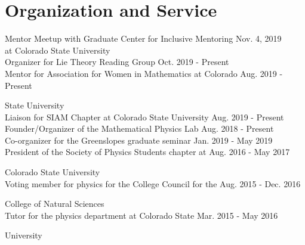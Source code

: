 \documentclass[12pt]{article} %
\begin{document}
\section{Organization and Service}
\begin{flushleft}
Mentor Meetup with Graduate Center for Inclusive Mentoring \hfill Nov. 4, 2019\\

\noindent  at Colorado State University\\
\vspace*{5pt}
Organizer for Lie Theory Reading Group \hfill Oct. 2019 - Present\\
\vspace*{5pt}
Mentor for Association for Women in Mathematics at Colorado \hfill Aug. 2019 - Present

\noindent  State University\\
\vspace*{5pt}
Liaison for SIAM Chapter at Colorado State University \hfill Aug. 2019 - Present\\
\vspace*{5pt}
Founder/Organizer of the Mathematical Physics Lab \hfill Aug. 2018 - Present\\
\vspace*{5pt}
Co-organizer for the Greenslopes graduate seminar \hfill Jan. 2019 - May 2019\\
\vspace*{5pt}
President of the Society of Physics Students chapter at \hfill Aug. 2016 - May 2017

\noindent Colorado State University\\
\vspace*{5pt}
Voting member for physics for the College Council for the \hfill Aug. 2015 - Dec. 2016

\noindent College of Natural Sciences\\
\vspace*{5pt}
Tutor for the physics department at Colorado State \hfill Mar. 2015 - May 2016

\noindent University
\end{flushleft}
\noindent\makebox[\textwidth]{\rule{\textwidth}{0.5mm}}
\end{document}
